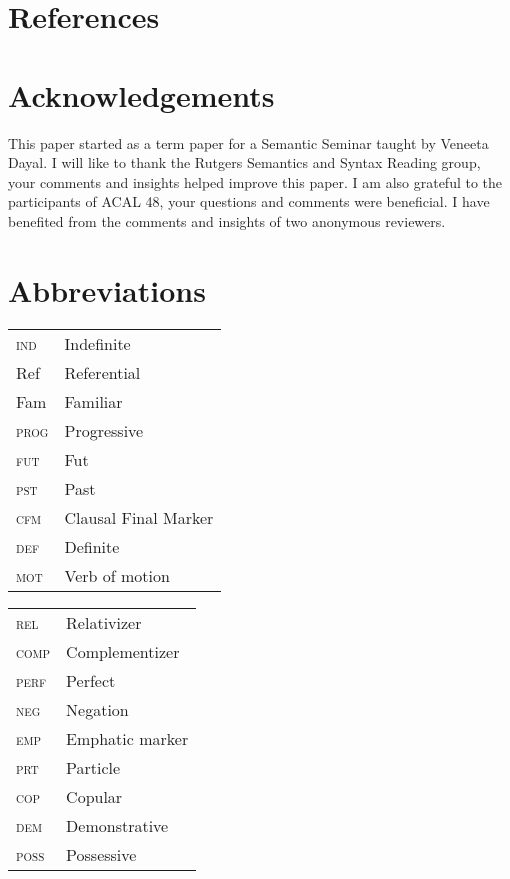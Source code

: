\documentclass[output=paper,modfonts,nonflat,draftmode]{langsci/langscibook}
\begin{document}
\section*{References}


\section*{Acknowledgements}
This paper started as a term paper for a Semantic Seminar taught by Veneeta Dayal. I will like to thank the Rutgers Semantics and Syntax Reading group, your comments and insights helped improve this paper. I am also grateful to the participants of  ACAL 48, your questions and comments were beneficial. I have benefited from the comments and insights of two anonymous reviewers. 


\section*{Abbreviations}

\begin{tabularx}{.45\textwidth}{lQ} 
\textsc{ind} & Indefinite \\
       {Ref} & Referential \\
       {Fam} & Familiar \\
\textsc{prog} & Progressive \\
\textsc{fut} & Fut \\
\textsc{pst} & Past \\
\textsc{cfm} & Clausal Final Marker \\
\textsc{def} & Definite  \\
\textsc{mot} & Verb of motion  \\
\end{tabularx}
\begin{tabularx}{.45\textwidth}{lQ}
\textsc{rel} & Relativizer \\
\textsc{comp} & Complementizer \\
\textsc{perf} & Perfect \\
\textsc{neg} & Negation \\
\textsc{emp} & Emphatic marker \\
\textsc{prt} & Particle \\
\textsc{cop} & Copular  \\
\textsc{dem} & Demonstrative \\
\textsc{poss} & Possessive  \\
\end{tabularx}
\end{document}
